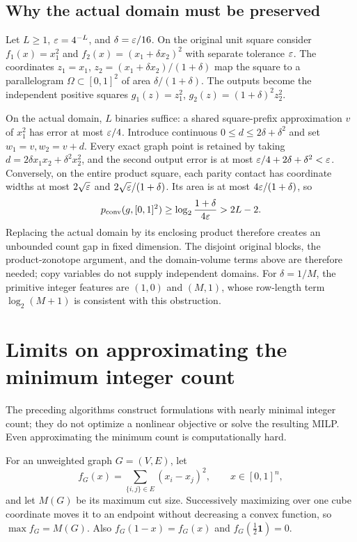 \subsection{Why the actual domain must be preserved}

\begin{example}\label{ex:thin-domain}
Let $L\ge1$, $\varepsilon=4^{-L}$, and $\delta=\varepsilon/16$. On the original
unit square consider $f_1(x)=x_1^2$ and
$f_2(x)=(x_1+\delta x_2)^2$ with separate tolerance $\varepsilon$. The coordinates
$z_1=x_1$, $z_2=(x_1+\delta x_2)/(1+\delta)$ map the square to a
parallelogram $\Omega\subset[0,1]^2$ of area $\delta/(1+\delta)$.
The outputs become the independent positive squares
$g_1(z)=z_1^2$, $g_2(z)=(1+\delta)^2z_2^2$.

On the actual domain, $L$ binaries suffice: a shared square-prefix
approximation $v$ of $x_1^2$ has error at most $\varepsilon/4$. Introduce
continuous $0\le d\le2\delta+\delta^2$ and set $w_1=v,w_2=v+d$.
Every exact graph point is retained by taking
$d=2\delta x_1x_2+\delta^2x_2^2$, and the second output error is at
most $\varepsilon/4+2\delta+\delta^2<\varepsilon$. Conversely, on the entire product
square, each parity contact has coordinate widths at most
$2\sqrt{\varepsilon}$ and $2\sqrt{\varepsilon}/(1+\delta)$. Its area is at most
$4\varepsilon/(1+\delta)$, so
\[
 p_{\mathrm{conv}}(g,[0,1]^2)\ge\log_2\frac{1+\delta}{4\varepsilon}>2L-2.
\]
Replacing the actual domain by its enclosing product therefore creates
an unbounded count gap in fixed dimension. The disjoint original blocks,
the product-zonotope argument, and the domain-volume terms above are
therefore needed; copy variables do not supply independent domains.
For $\delta=1/M$, the primitive integer features are $(1,0)$ and
$(M,1)$, whose row-length term $\log_2(M+1)$ is consistent with this
obstruction.
\end{example}

\section{Limits on approximating the minimum integer count}\label{sec:quadratic-hardness}

The preceding algorithms construct formulations with nearly minimal
integer count; they do not optimize a nonlinear objective or solve the
resulting MILP. Even approximating the minimum count is computationally
hard.

For an unweighted graph $G=(V,E)$, let
\[
 f_G(x)=\sum_{\{i,j\}\in E}(x_i-x_j)^2,\qquad x\in[0,1]^n,
\]
and let $M(G)$ be its maximum cut size. Successively maximizing over
one cube coordinate moves it to an endpoint without decreasing a convex
function, so $\max f_G=M(G)$. Also $f_G(1-x)=f_G(x)$ and
$f_G(\frac12\mathbf1)=0$.

